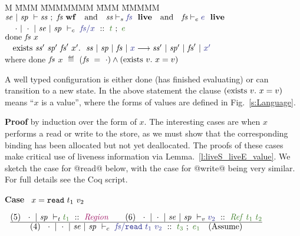 
\clearpage{}

\begin{theorem}[Progress]
\label{t:Progress}
\end{theorem}
\begin{tabbing}
M \= MMM \= MMMMMMM \= MMM \= MMMMM \kill
\> \pIf    \> $\WfFS{\mse}{\msp}{\mss}{\mfs}
                ~~~\pand~~~ \LiveS{\mss}{\mfs} 
                ~~~\pand~~~ \LiveE{\mfs}{e}$                             \\
\> ~\pand  \> $\TypeC{~\nil}{\nil}{\mse}{\msp}{\mfs}{x}{t}{e}$            \\
\> \pthen  \> $\textrm{done}~ \mathit{fs}~ x$                                      \\
\> ~ \por  \> $\trm{exists}~ \mss'~ \msp'~ \mfs'~ x'.~~ 
                \StepF{\mss}{\msp}{\mfs}{x}{\mss'}{\msp'}{\mfs'}{x'}$
\\[1ex]
\> where   \> done $\mathit{fs}$ $x$ $\eqdef$ ($\mathit{fs} ~=~ \cdot) \wedge (\textrm{exists}~ v.~ x = v)$
\end{tabbing}

\noindent
A well typed configuration is either done (has finished evaluating) or can transition to a new state. In the above statement the clause $(\textrm{exists}~ v.~ x = v)$ means ``$x$ is a value'', where the forms of values are defined in Fig.~\ref{s:Language}.

\medskip\noindent
\textbf{Proof} by induction over the form of $x$. The interesting cases are when $x$ performs a read or write to the store, as we must show that the corresponding binding has been allocated but not yet deallocated. The proofs of these cases make critical use of liveness information via Lemma.~\ref{l:liveS_liveE_value}. We sketch the case for @read@ below, with the case for @write@ being very similar. For full details see the Coq script.

\medskip
\noindent
\textbf{Case}~ $x = \texttt{read}~ t_1~ v_2$
\medskip

$
\begin{array}{cc}
\ruleI
{       
        (5)~~ 
        \KindT    {\nil}{\msp}{t_1}{\kcRegion}
\qq
        (6)~~ 
        \TypeV    {\nil}{\nil}{\mse}{\msp}
                  {v_2}
                  {\tref{t_1}{t_2}}
}
{
        (4)~~ \TypeC  {\nil}{\nil}{\mse}{\msp}{\mfs}
                {\kread~ t_1~ v_2}
                {t_3}
                {e_1}
        ~~~ (\trm{Assume})
}
& 
\end{array}
$

